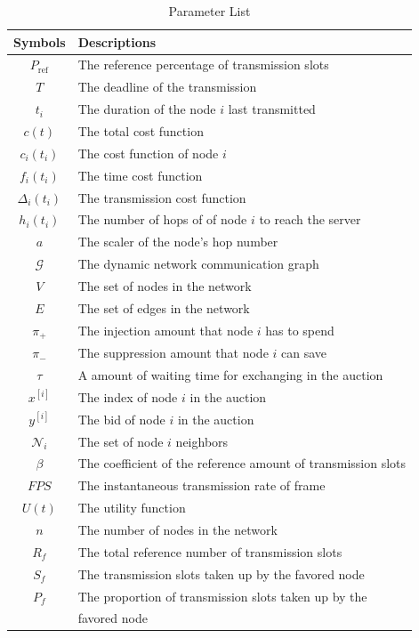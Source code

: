 \documentclass[journal]{IEEEtran}  %
\begin{document}
\begin{table}[htpb]
\small
\caption{Parameter List}
\label{tab:para_list}
\begin{center}
\begin{tabular}{cl}
\toprule
\centering Symbols & Descriptions \\ 
\midrule
$P_{\text{ref}}$  &  The reference percentage of transmission slots \\ 
$T$  &  The deadline of the transmission \\ 
$t_i$  &  The duration of the node $i$ last transmitted \\ 
$c(t)$  &  The total cost function \\ 
$c_i(t_i)$  &  The cost function of node $i$ \\ 
$f_i(t_i)$  &  The time cost function  \\ 
$\Delta_i(t_i)$  &  The transmission cost function  \\ 
$h_i(t_i)$  & The number of hops of of node $i$ to reach the server \\ 
$a$  & The scaler of the node's hop number    \\ 
$\mathcal{G}$  &  The dynamic network communication graph \\ 
$V$ & The set of nodes in the network \\
$E$ & The set of edges in the network \\
$\pi_+$ & The injection amount that node $i$ has to spend \\
$\pi_-$ & The suppression amount that node $i$ can save \\
$\tau$ & A amount of waiting time for exchanging in the auction \\
$x^{[i]}$ & The index of node $i$ in the auction  \\
$y^{[i]}$ & The bid of node $i$ in the auction  \\
$\mathcal{N}_i$ & The set of node $i$ neighbors \\
$\beta$ & The coefficient of the reference amount of transmission slots \\
$FPS$ & The instantaneous transmission rate of frame \\
$U(t)$ & The utility function \\
$n$ & The number of nodes in the network \\
$R_f$ & The total reference number of transmission slots \\
$S_f$ & The transmission slots taken up by the favored node \\
$P_f$ & The proportion of transmission slots taken up by the  \\
 & favored node \\
\bottomrule
\end{tabular} 
\end{center}
\end{table}
\end{document}
